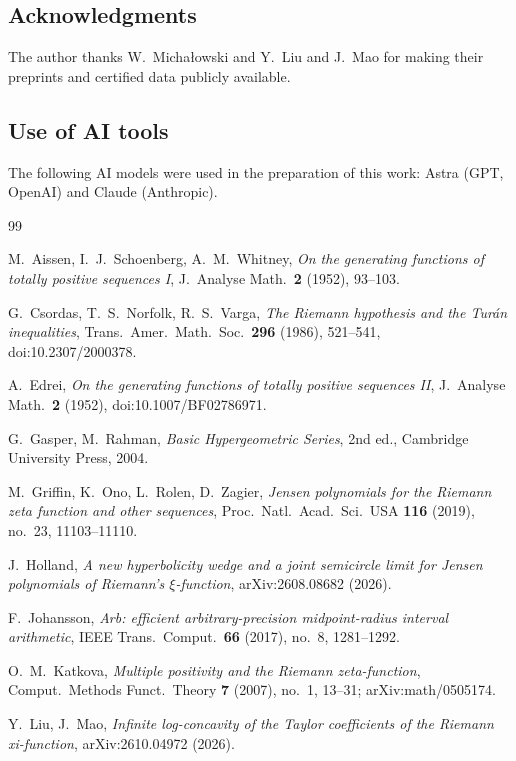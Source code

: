 \documentclass[11pt,a4paper]{article}
\numberwithin{equation}{section}
\theoremstyle{definition}
\theoremstyle{remark}
\begin{document}
\subsection*{Acknowledgments}
The author thanks W.~Michałowski and Y.~Liu and J.~Mao for making their preprints and certified data publicly available.

\subsection*{Use of AI tools}
The following AI models were used in the preparation of this work: Astra (GPT, OpenAI) and Claude (Anthropic).

\begin{thebibliography}{99}

M.~Aissen, I.~J.~Schoenberg, A.~M.~Whitney,
\emph{On the generating functions of totally positive sequences I},
J.~Analyse Math.\ \textbf{2} (1952), 93--103.

G.~Csordas, T.~S.~Norfolk, R.~S.~Varga,
\emph{The Riemann hypothesis and the Tur\'an inequalities},
Trans.\ Amer.\ Math.\ Soc.\ \textbf{296} (1986), 521--541, doi:10.2307/2000378.

A.~Edrei,
\emph{On the generating functions of totally positive sequences II},
J.~Analyse Math.\ \textbf{2} (1952), doi:10.1007/BF02786971.

G.~Gasper, M.~Rahman,
\emph{Basic Hypergeometric Series}, 2nd ed.,
Cambridge University Press, 2004.

M.~Griffin, K.~Ono, L.~Rolen, D.~Zagier,
\emph{Jensen polynomials for the Riemann zeta function and other sequences},
Proc.\ Natl.\ Acad.\ Sci.\ USA \textbf{116} (2019), no.~23, 11103--11110.

J.~Holland,
\emph{A new hyperbolicity wedge and a joint semicircle limit for Jensen polynomials of Riemann's $\xi$-function},
arXiv:2608.08682 (2026).

F.~Johansson,
\emph{Arb: efficient arbitrary-precision midpoint-radius interval arithmetic},
IEEE Trans.\ Comput.\ \textbf{66} (2017), no.~8, 1281--1292.

O.~M.~Katkova,
\emph{Multiple positivity and the Riemann zeta-function},
Comput.\ Methods Funct.\ Theory \textbf{7} (2007), no.~1, 13--31; arXiv:math/0505174.

Y.~Liu, J.~Mao,
\emph{Infinite log-concavity of the Taylor coefficients of the Riemann xi-function},
arXiv:2610.04972 (2026).


\end{thebibliography}
\end{document}
